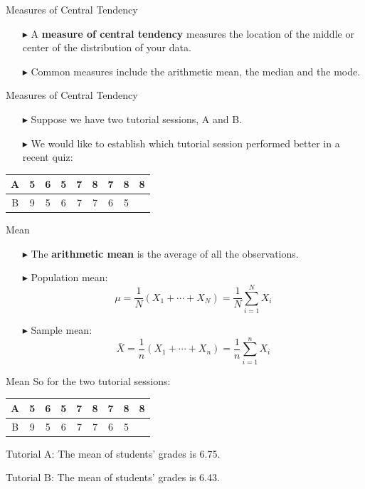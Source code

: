 \documentclass[12pt]{beamer}
\begin{document}
\begin{frame}{Measures of Central Tendency}
	\begin{itemize}
		\item[$\blacktriangleright$] A {\bf measure of central tendency} measures the location of the middle or center of the distribution of your data.
		\item[$\blacktriangleright$] Common measures include the arithmetic mean, the median and the mode.
	\end{itemize}
\end{frame}
\begin{frame}{Measures of Central Tendency}
	\begin{itemize}
		\item[$\blacktriangleright$] Suppose we have two tutorial sessions, A and B.
		\item[$\blacktriangleright$] We would like to establish which tutorial session performed better in a recent quiz:
	\end{itemize}
	\vspace{0.5cm}
	\centering
	\begin{tabular}{|c|c|c|c|c|c|c|c|c|}
		\hline
		A & 5 & 6 & 5 & 7 & 8 & 7 & 8 & 8\\
		\hline
		B & 9 & 5 & 6 & 7 & 7 & 6 & 5 & \\
		\hline
	\end{tabular}
\end{frame}
\begin{frame}{Mean}
	\begin{itemize}
		\item[$\blacktriangleright$] The {\bf arithmetic mean} is the average of all the observations.
		\item[$\blacktriangleright$] Population mean:
		$$\mu=\frac{1}{N}(X_1+\cdots+X_N)=\frac{1}{N}\sum_{i=1}^NX_i$$
		\item[$\blacktriangleright$] Sample mean:
		$$\bar{X}=\frac{1}{n}(X_1+\cdots+X_n)=\frac{1}{n}\sum_{i=1}^nX_i$$
	\end{itemize}
\end{frame}
\begin{frame}{Mean}
	So for the two tutorial sessions:
\vspace{0.5cm}
	
\begin{center}
	\begin{tabular}{|c|c|c|c|c|c|c|c|c|}
		\hline
		A & 5 & 6 & 5 & 7 & 8 & 7 & 8 & 8\\
		\hline
		B & 9 & 5 & 6 & 7 & 7 & 6 & 5 & \\
		\hline
	\end{tabular}
    
\end{center}
\vspace{0.5cm}
	
	Tutorial A: The mean of students' grades is 6.75.
	
	Tutorial B: The mean of students' grades is 6.43.
\end{frame}
\end{document}

